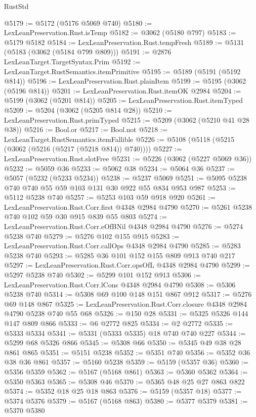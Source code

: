 \begin{lexlean}{RustStd}
\begin{coremodule}
@5179 := @5172 (@5176 @5069 @740)
@5180 := LexLeanPreservation.Rust.isTemp
@5182 := @3062 (@5180 @797)
@5183 := @5179 @5182
@5184 := LexLeanPreservation.Rust.tempFresh
@5189 := @5131 (@5183 (@3062 (@5184 @799 @809)))
@5191 := @2876 LexLeanTarget.TargetSyntax.Prim
@5192 := LexLeanTarget.RustSemantics.itemPrimitive
@5195 := @5189 (@5191 (@5192 @814))
@5196 := LexLeanPreservation.Rust.plainItem
@5199 := @5195 (@3062 (@5196 @814))
@5201 := LexLeanPreservation.Rust.itemOK @2984
@5204 := @5199 (@3062 (@5201 @814))
@5205 := LexLeanPreservation.Rust.itemTyped
@5209 := @5204 (@3062 (@5205 @814 @28))
@5210 := LexLeanPreservation.Rust.primTyped
@5215 := @5209 (@3062 (@5210 @41 @28 @38))
@5216 := Bool.or
@5217 := Bool.not
@5218 := LexLeanTarget.RustSemantics.itemFallible
@5226 := @5108 (@5118 (@5215 (@3062 (@5216 (@5217 (@5218 @814)) @740))))
@5227 := LexLeanPreservation.Rust.slotFree
@5231 := @5226 (@3062 (@5227 @5069 @36))
@5232 := @5059 @36
@5233 := @5062 @38
@5234 := @5064 @36
@5237 := @5057 (@5232 (@5233 @5234))
@5238 := @5237 @5069
@5251 := @5095 @5238 @740 @740 @55 @59 @103 @131 @30 @922 @55 @834 @953 @987
@5253 := @5112 @5238 @740
@5257 := @5253 @103 @59 @918 @920
@5261 := LexLeanPreservation.Rust.Corr.first @4348 @2984 @4790
@5270 := @5261 @5238 @740 @102 @59 @30 @915 @839 @55 @803
@5274 := LexLeanPreservation.Rust.Corr.eOfBNil @4348 @2984 @4790
@5276 := @5274 @5238 @740
@5279 := @5276 @102 @155 @915
@5283 := LexLeanPreservation.Rust.Corr.callOps @4348 @2984 @4790
@5285 := @5283 @5238 @740
@5293 := @5285 @36 @101 @152 @155 @809 @913 @740 @217
@5297 := LexLeanPreservation.Rust.Corr.opsOfL @4348 @2984 @4790
@5299 := @5297 @5238 @740
@5302 := @5299 @101 @152 @913
@5306 := LexLeanPreservation.Rust.Corr.lCons @4348 @2984 @4790
@5308 := @5306 @5238 @740
@5314 := @5308 @69 @100 @148 @151 @867 @912
@5317 := @5276 @69 @148 @867
@5325 := LexLeanPreservation.Rust.Corr.closure @4348 @2984 @4790 @5238 @740 @55 @68
@5326 := @150 @28
@5331 := @5325 @5326 @144 @147 @809 @866
@5333 := @6 @2772 @825
@5334 := @2 @2772
@5335 := @5333 @5334
@5341 := @5331 (@5333 @5335) @18 @740 @740 @227
@5344 := @5299 @68 @5326 @866
@5345 := @5308 @66
@5350 := @5345 @49 @38 @28 @861 @865
@5351 := @5151 @5238
@5352 := @5351 @740
@5356 := @5352 @36 @38 @36 @861
@5357 := @5160 @5238
@5359 := @5159 (@5357 @36)
@5360 := @5356 @5359
@5362 := @5167 (@5168 @861)
@5363 := @5360 @5362
@5364 := @5350 @5363
@5365 := @5308 @46
@5370 := @5365 @48 @25 @27 @863 @822
@5374 := @5352 @18 @25 @18 @863
@5376 := @5159 (@5357 @18)
@5377 := @5374 @5376
@5379 := @5167 (@5168 @863)
@5380 := @5377 @5379
@5381 := @5370 @5380

\end{coremodule}
\end{lexlean}

